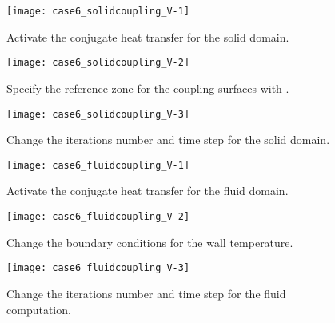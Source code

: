 \begin{figure}[h!]
\begin{center}
\texttt{[image: case6\_solidcoupling\_V-1]}
\caption{Activate the conjugate heat transfer for the solid domain.}
\label{fig1_e5}
\end{center}
\end{figure}

\begin{figure}[h!]
\begin{center}
\texttt{[image: case6\_solidcoupling\_V-2]}
\caption{Specify the reference zone for the coupling surfaces with \CS.}
\label{fig1_e5}
\end{center}
\end{figure}

\newpage

\begin{figure}[h!]
\begin{center}
\texttt{[image: case6\_solidcoupling\_V-3]}
\caption{Change the iterations number and time step for the solid domain.}
\label{fig1_e5}
\end{center}
\end{figure}

\begin{figure}[h!]
\begin{center}
\texttt{[image: case6\_fluidcoupling\_V-1]}
\caption{Activate the conjugate heat transfer for the fluid domain.}
\label{fig1_e5}
\end{center}
\end{figure}

\newpage

\begin{figure}[h!]
\begin{center}
\texttt{[image: case6\_fluidcoupling\_V-2]}
\caption{Change the boundary conditions for the wall temperature.}
\label{fig1_e5}
\end{center}
\end{figure}

\begin{figure}[h!]
\begin{center}
\texttt{[image: case6\_fluidcoupling\_V-3]}
\caption{Change the iterations number and time step for the fluid computation.}
\label{fig1_e5}
\end{center}
\end{figure}

